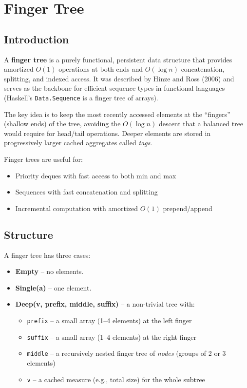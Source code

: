 \section{Finger Tree}

\subsection{Introduction}

A \textbf{finger tree} is a purely functional, persistent data structure that provides amortized $O(1)$ operations at both ends and $O(\log n)$ concatenation, splitting, and indexed access. It was described by Hinze and Ross (2006) and serves as the backbone for efficient sequence types in functional languages (Haskell's \texttt{Data.Sequence} is a finger tree of arrays).

The key idea is to keep the most recently accessed elements at the ``fingers'' (shallow ends) of the tree, avoiding the $O(\log n)$ descent that a balanced tree would require for head/tail operations. Deeper elements are stored in progressively larger cached aggregates called \emph{tags}.

Finger trees are useful for:
\begin{itemize}
\item Priority deques with fast access to both min and max
\item Sequences with fast concatenation and splitting
\item Incremental computation with amortized $O(1)$ prepend/append
\end{itemize}

\subsection{Structure}

A finger tree has three cases:

\begin{itemize}
\item \textbf{Empty} -- no elements.
\item \textbf{Single(a)} -- one element.
\item \textbf{Deep(v, prefix, middle, suffix)} -- a non-trivial tree with:
  \begin{itemize}
  \item \texttt{prefix} -- a small array (1--4 elements) at the left finger
  \item \texttt{suffix} -- a small array (1--4 elements) at the right finger
  \item \texttt{middle} -- a recursively nested finger tree of \emph{nodes} (groups of 2 or 3 elements)
  \item \texttt{v} -- a cached measure (e.g., total size) for the whole subtree
  \end{itemize}
\end{itemize}

